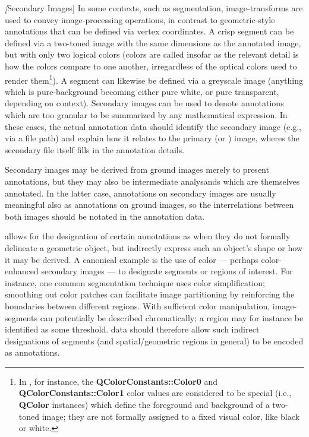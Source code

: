 {\begin{description}
\textit[Secondary Images]  In some contexts, such 
as segmentation, image-transforms are used to 
convey image-processing operations, in contrast 
to geometric-style annotations that can be 
defined via vertex coordinates.  A crisp 
segment can be defined via a two-toned image 
with the same dimensions as the annotated 
image, but with only two logical colors 
(colors are called  insofar as the 
relevant detail is how the colors compare to 
one another, irregardless of the optical colors 
used to render them\footnote{In \Qt{}, for instance, 
the \textbf{QColorConstants::Color0} and 
\textbf{QColorConstants::Color1} color values 
are considered to be special  
(i.e., \textbf{QColor} instances) which define 
the foreground and background of a two-toned 
image; they are not formally assigned to a 
fixed visual color, like black or white.}).  
A  segment can likewise be defined 
via a greyscale image (anything which 
is pure-background becoming either pure white, 
or pure transparent, depending on context).  
Secondary images can be used to denote annotations 
which are too granular to be summarized by 
any mathematical expression.  In these cases, 
the actual annotation data should identify the 
secondary image (e.g., via a file path) and 
explain how it relates to the primary 
(or ) image, wheres the secondary 
file itself fills in the annotation details.      

Secondary images may be derived from ground 
images merely to present annotations, but they 
may also be intermediate analysands which are 
themselves annotated.  In the latter case, 
annotations on secondary images are usually 
meaningful also as annotations on ground 
images, so the interrelations between both 
images should be notated in the annotation data.

\item[Proscriptive Annotations]  \lAXFI{} 
allows for the designation of certain annotations 
as  when they do not 
formally delineate a geometric object, but 
indirectly express such an object's shape 
or how it may be derived.  A canonical 
example is the use of color --- perhaps 
color-enhanced secondary images --- to 
designate segments or regions of interest.  
For instance, one common segmentation technique 
uses color simplification; smoothing out color 
patches can facilitate image partitioning 
by reinforcing the boundaries between different 
regions.  With sufficient color manipulation, 
image-segments can potentially be described 
chromatically; a region may for instance 
be identified as  some 
threshold.  \lAXFI{} data should therefore 
allow such indirect designations of 
segments (and spatial/geometric regions in 
general) to be encoded as annotations.


\end{description}}
